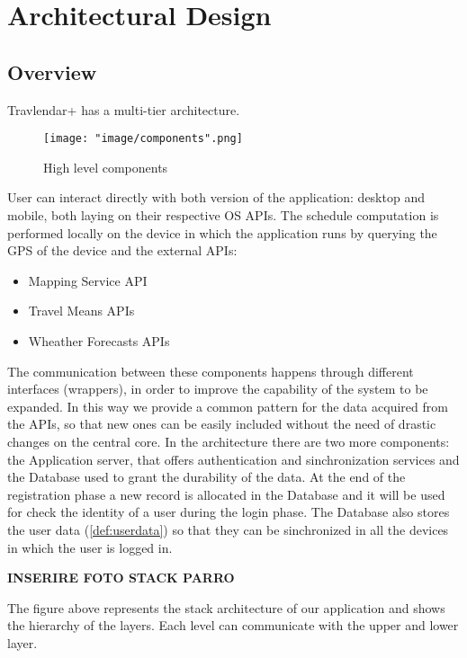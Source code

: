 \chapter{Architectural Design}

\section{Overview}

Travlendar+ has a multi-tier architecture.

\begin{figure}[H]
\begin{center}
\texttt{[image: "image/components".png]}
\caption{High level components}
\end{center}
\end{figure}
 
User can interact directly with both version of the application: desktop and mobile, both laying on their respective OS APIs. The schedule computation is performed locally on the device in which the application runs by querying the GPS of the device and the external APIs:

\begin{itemize}
\item Mapping Service API
\item Travel Means APIs
\item Wheather Forecasts APIs
\end{itemize}

The communication between these components happens through different interfaces (wrappers), in order to improve the capability of the system to be expanded. In this way we provide a common pattern for the data acquired from the APIs, so that new ones can be easily included without the need of drastic changes on the central core.
In the architecture there are two more components: the Application server, that offers authentication and sinchronization services and the Database used to grant the durability of the data. At the end of the registration phase a new record is allocated in the Database and it will be used for check the identity of a user during the login phase. The Database also stores the user data (\ref{def:userdata}) so that they can be sinchronized in all the devices in which the user is logged in. 

\textbf{INSERIRE FOTO STACK PARRO}

The figure above represents the stack architecture of our application and shows the hierarchy of the layers. Each level can communicate with the upper and lower layer.

